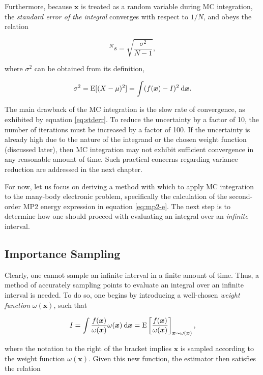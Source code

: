 Furthermore, because $\bm x$ is treated as a random variable during MC
integration, the \emph{standard error of the integral} converges with respect to
$1/N$, and obeys the relation

\begin{equation}
	^Ns = \sqrt{\frac{\sigma^2}{N - 1}},
	\label{eq:stderr}
\end{equation}

\noindent where $\sigma^2$ can be obtained from its definition,

\begin{equation}
	\sigma^2 = \text E[(X - \mu)^2] = \int (f(\bm x) - I)^2  \:\mathrm{d} \bm x.
\end{equation}

The main drawback of the MC integration is the slow rate of convergence, as
exhibited by equation \ref{eq:stderr}. To reduce the uncertainty by a factor of
10, the number of iterations must be increased by a factor of 100. If the
uncertainty is already high due to the nature of the integrand or the chosen
weight function (discussed later), then MC integration may not exhibit
sufficient convergence in any reasonable amount of time. Such practical concerns
regarding variance reduction are addressed in the next chapter.

For now, let us focus on deriving a method with which to apply MC integration to
the many-body electronic problem, specifically the calculation of the
second-order MP2 energy expression in equation \ref{eq:mp2-e}. The next step is
to determine how one should proceed with evaluating an integral over an
\emph{infinite} interval.

\subsection{Importance Sampling}

Clearly, one cannot sample an infinite interval in a finite amount of time.
Thus, a method of accurately sampling points to evaluate an integral over an
infinite interval is needed. To do so, one begins by introducing a well-chosen
\emph{weight function} $\omega(\bm x)$, such that

\begin{equation}
	I = \int \frac{f(\bm x)}{\omega(\bm x)} \omega(\bm x) \:\mathrm{d} \bm x
	= \text E\left[\frac{f(\bm x)}{\omega(\bm x)} \right]_{\bm x \sim \omega(\bm x)},
\end{equation}

\noindent where the notation to the right of the bracket implies $\bm x$ is
sampled according to the weight function $\omega(\bm x)$. Given this new
function, the estimator then satisfies the relation

